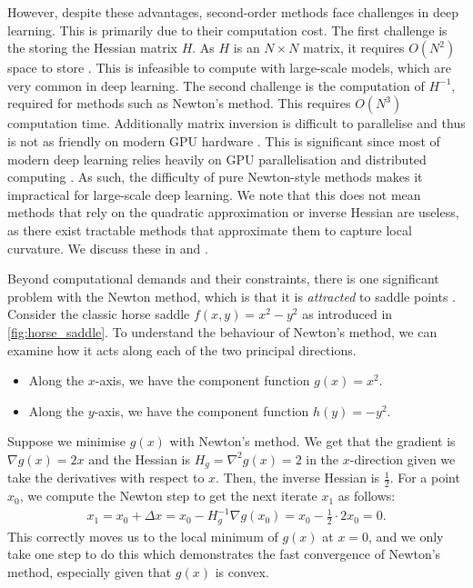 However, despite these advantages, second-order methods face challenges in deep learning. This is primarily due to their computation cost. The first challenge is the storing the Hessian matrix $H$. As $H$ is an $N \times N$ matrix, it requires $O(N^2)$ space to store \citep{deep_learning_book}. This is infeasible to compute with large-scale models, which are very common in deep learning. The second challenge is the computation of $H^{-1}$, required for methods such as Newton's method. This requires $O(N^3)$ computation time. Additionally matrix inversion is difficult to parallelise and thus is not as friendly on modern GPU hardware \citep{deep_learning_book}. This is significant since most of modern deep learning relies heavily on GPU parallelisation and distributed computing \citep{pytorch}. As such, the difficulty of pure Newton-style methods makes it impractical for large-scale deep learning. We note that this does not mean methods that rely on the quadratic approximation or inverse Hessian are useless, as there exist tractable methods that approximate them to capture local curvature. We discuss these in  and .

Beyond computational demands and their constraints, there is one significant problem with the Newton method, which is that it is \textit{attracted} to saddle points \citep{dauphin2014sfn}. Consider the classic horse saddle $f(x, y) = x^2 - y^2$ as introduced in \cref{fig:horse_saddle}. To understand the behaviour of Newton's method, we can examine how it acts along each of the two principal directions. 
\begin{itemize}
    \item Along the $x$-axis, we have the component function $g(x) = x^2$. 
    \item Along the $y$-axis, we have the component function $h(y) = -y^2$.
\end{itemize}
Suppose we minimise $g(x)$ with Newton's method. We get that the gradient is $\nabla g(x) = 2x$ and the Hessian is $H_g = \nabla^2 g(x) = 2$ in the $x$-direction given we take the derivatives with respect to $x$. Then, the inverse Hessian is $\frac{1}{2}$. For a point $x_0$, we compute the Newton step to get the next iterate $x_1$ as follows:
\begin{align}
    x_1 = x_0 + \Delta x = x_0 - H_g^{-1} \nabla g(x_0) = x_0 - \frac{1}{2} \cdot 2 x_0 = 0.
\end{align}
This correctly moves us to the local minimum of $g(x)$ at $x = 0$, and we only take one step to do this which demonstrates the fast convergence of Newton's method, especially given that $g(x)$ is convex. 

